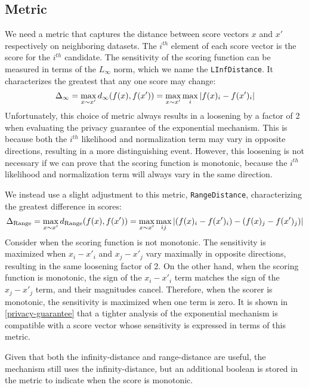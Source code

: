 \documentclass{article}
\begin{document}
\subsection{Metric}
We need a metric that captures the distance between score vectors $x$ and $x'$ respectively on neighboring datasets. 
The $i^{th}$ element of each score vector is the score for the $i^{th}$ candidate.
The sensitivity of the scoring function can be measured in terms of the $L_\infty$ norm, which we name the \texttt{LInfDistance}. 
It characterizes the greatest that any one score may change:
\begin{equation}
    \Delta_{\infty} = \max_{x \sim x'} d_{\infty}(f(x), f(x')) = \max_{x \sim x'} \max_i \abs{f(x)_i - f(x')_i}
\end{equation}
Unfortunately, this choice of metric always results in a loosening by a factor of 2 when evaluating the privacy guarantee of the exponential mechanism.
This is because both the $i^{th}$ likelihood and normalization term may vary in opposite directions, resulting in a more distinguishing event.
However, this loosening is not necessary if we can prove that the scoring function is monotonic, because the $i^{th}$ likelihood and normalization term will always vary in the same direction.

We instead use a slight adjustment to this metric, \texttt{RangeDistance}, characterizing the greatest difference in scores:
\begin{equation}
    \Delta_{\text{Range}} = \max_{x \sim x'} d_{\text{Range}}(f(x), f(x')) = \max_{x \sim x'} \max_{ij} \abs{(f(x)_i - f(x')_i) - (f(x)_j - f(x')_j)}
\end{equation}
Consider when the scoring function is not monotonic.
The sensitivity is maximized when $x_i - x'_i$ and $x_j - x'_j$ vary maximally in opposite directions, resulting in the same loosening factor of 2.
On the other hand, when the scoring function is monotonic, the sign of the $x_i - x'_i$ term matches the sign of the $x_j - x'_j$ term,
and their magnitudes cancel.
Therefore, when the scorer is monotonic, the sensitivity is maximized when one term is zero. 
It is shown in \ref{privacy-guarantee} that a tighter analysis of the exponential mechanism is compatible with a score vector whose sensitivity is expressed in terms of this metric.

Given that both the infinity-distance and range-distance are useful, the mechanism still uses the infinity-distance,
but an additional boolean is stored in the metric to indicate when the score is monotonic.
\end{document}
